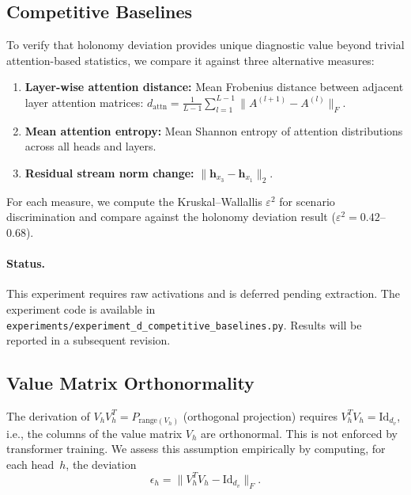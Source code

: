 \subsection{Competitive Baselines}
\label{app:competitive}

To verify that holonomy deviation provides unique diagnostic value beyond trivial
attention-based statistics, we compare it against three alternative measures:

\begin{enumerate}
    \item \textbf{Layer-wise attention distance:} Mean Frobenius distance between
    adjacent layer attention matrices:
    $d_{\mathrm{attn}} = \frac{1}{L-1}\sum_{l=1}^{L-1} \|A^{(l+1)} - A^{(l)}\|_F$.
    \item \textbf{Mean attention entropy:} Mean Shannon entropy of attention
    distributions across all heads and layers.
    \item \textbf{Residual stream norm change:} $\|\mathbf{h}_{x_3} -
    \mathbf{h}_{x_1}\|_2$.
\end{enumerate}

For each measure, we compute the Kruskal--Wallallis $\varepsilon^2$ for scenario
discrimination and compare against the holonomy deviation result
($\varepsilon^2 = 0.42$--$0.68$).

\paragraph{Status.}
This experiment requires raw activations and is deferred pending extraction. The
experiment code is available in
\texttt{experiments/experiment\_d\_competitive\_baselines.py}. Results will be
reported in a subsequent revision.

\subsection{Value Matrix Orthonormality}
\label{app:orthonormality}

The derivation of $V_h V_h^T = P_{\mathrm{range}(V_h)}$ (orthogonal projection)
requires $V_h^T V_h = \mathrm{Id}_{d_v}$, i.e., the columns of the value matrix
$V_h$ are orthonormal. This is not enforced by transformer training. We assess
this assumption empirically by computing, for each head~$h$, the deviation
\begin{equation}
    \epsilon_h = \|V_h^T V_h - \mathrm{Id}_{d_v}\|_F.
\end{equation}

